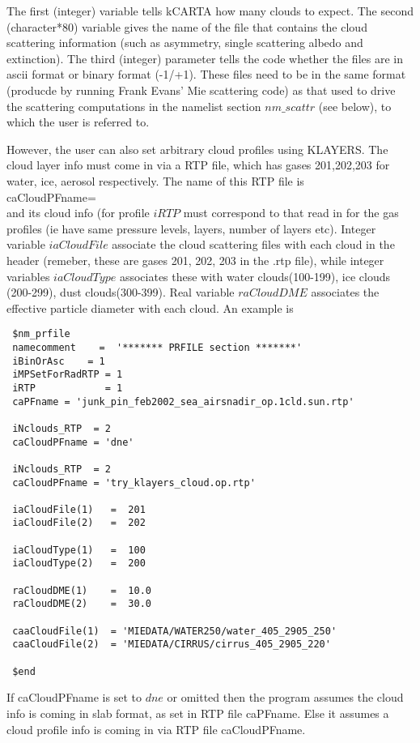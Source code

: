 \documentclass[12pt]{article}
\newcommand{\ttab}{\indent\indent}
\begin{document}
{The first (integer) variable tells kCARTA how many clouds to expect.
The second (character*80) variable gives the name of the file that contains 
the cloud scattering information (such as asymmetry, single scattering albedo 
and extinction). The third (integer) parameter tells the code whether the 
files are in ascii format or binary format (-1/+1). These files need to be in 
the same format (producde by running Frank Evans' Mie scattering code) as that
used to drive the scattering computations in the namelist section 
$nm\_scattr$ (see below), to which the user is referred to.

However, the user can also set arbitrary cloud profiles using KLAYERS. The 
cloud layer info must come in via a RTP file, which has gases 201,202,203 for
water, ice, aerosol respectively. The name of this RTP file is \\
{\sf
\ttab caCloudPFname= \\
}
and its cloud info (for profile $iRTP$ must correspond to that read in for the
gas profiles (ie have same pressure levels, layers, number of layers etc).
Integer variable $iaCloudFile$ associate the cloud scattering files with
each cloud in the header (remeber, these are gases 201, 202, 203 in the .rtp 
file), while integer variables $iaCloudType$ associates these with water 
clouds(100-199), ice clouds (200-299), dust clouds(300-399). 
Real variable $raCloudDME$ associates the effective particle 
diameter with each cloud. An example is 

\begin{verbatim}
 $nm_prfile
 namecomment	=  '******* PRFILE section *******'
 iBinOrAsc    = 1
 iMPSetForRadRTP = 1
 iRTP            = 1
 caPFname = 'junk_pin_feb2002_sea_airsnadir_op.1cld.sun.rtp'

 iNclouds_RTP  = 2
 caCloudPFname = 'dne'

 iNclouds_RTP  = 2
 caCloudPFname = 'try_klayers_cloud.op.rtp'

 iaCloudFile(1)   =  201 
 iaCloudFile(2)   =  202

 iaCloudType(1)   =  100
 iaCloudType(2)   =  200

 raCloudDME(1)    =  10.0
 raCloudDME(2)    =  30.0

 caaCloudFile(1)  = 'MIEDATA/WATER250/water_405_2905_250'
 caaCloudFile(2)  = 'MIEDATA/CIRRUS/cirrus_405_2905_220'

 $end
\end{verbatim}
If caCloudPFname is set to $dne$ or omitted then the program assumes the cloud
info is coming in slab format, as set in RTP file caPFname. Else it assumes
a cloud profile info is coming in via RTP file caCloudPFname.

}
\end{document}
